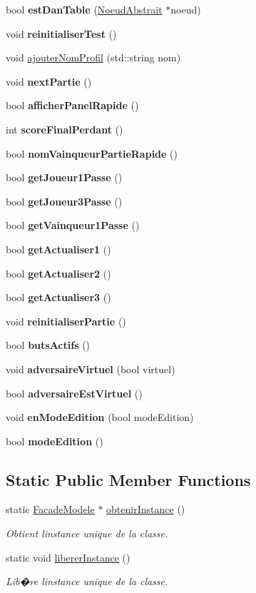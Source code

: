 \begin{DoxyCompactItemize}
bool {\bfseries est\+Dan\+Table} (\hyperlink{class_noeud_abstrait}{Noeud\+Abstrait} $\ast$noeud)
\item 
void {\bfseries reinitialiser\+Test} ()
\item 
void \hyperlink{group__inf2990_gaa15ce9a1038a9b4674882ceb9ad9c195}{ajouter\+Nom\+Profil} (std\+::string nom)
\item 
void {\bfseries next\+Partie} ()
\item 
bool {\bfseries afficher\+Panel\+Rapide} ()
\item 
int {\bfseries score\+Final\+Perdant} ()
\item 
bool {\bfseries nom\+Vainqueur\+Partie\+Rapide} ()
\item 
bool {\bfseries get\+Joueur1\+Passe} ()
\item 
bool {\bfseries get\+Joueur3\+Passe} ()
\item 
bool {\bfseries get\+Vainqueur1\+Passe} ()
\item 
bool {\bfseries get\+Actualiser1} ()
\item 
bool {\bfseries get\+Actualiser2} ()
\item 
bool {\bfseries get\+Actualiser3} ()
\item 
void {\bfseries reinitialiser\+Partie} ()
\item 
bool {\bfseries buts\+Actifs} ()
\item 
void {\bfseries adversaire\+Virtuel} (bool virtuel)
\item 
bool {\bfseries adversaire\+Est\+Virtuel} ()
\item 
void {\bfseries en\+Mode\+Edition} (bool mode\+Edition)
\item 
\hypertarget{class_facade_modele_ad238c88b5a05c382e5dee186527d5b9a}{}\label{class_facade_modele_ad238c88b5a05c382e5dee186527d5b9a} 
bool {\bfseries mode\+Edition} ()
\end{DoxyCompactItemize}
\subsection*{Static Public Member Functions}
\begin{DoxyCompactItemize}
\item 
static \hyperlink{class_facade_modele}{Facade\+Modele} $\ast$ \hyperlink{group__inf2990_gaf52e6d65d1a911d3e1699fc30af97d38}{obtenir\+Instance} ()
\begin{DoxyCompactList}\small\item\em Obtient l\textquotesingle{}instance unique de la classe. \end{DoxyCompactList}\item 
static void \hyperlink{group__inf2990_gacbf0495fda26f5be37089470dc5f4372}{liberer\+Instance} ()
\begin{DoxyCompactList}\small\item\em Lib�re l\textquotesingle{}instance unique de la classe. \end{DoxyCompactList}\end{DoxyCompactItemize}


